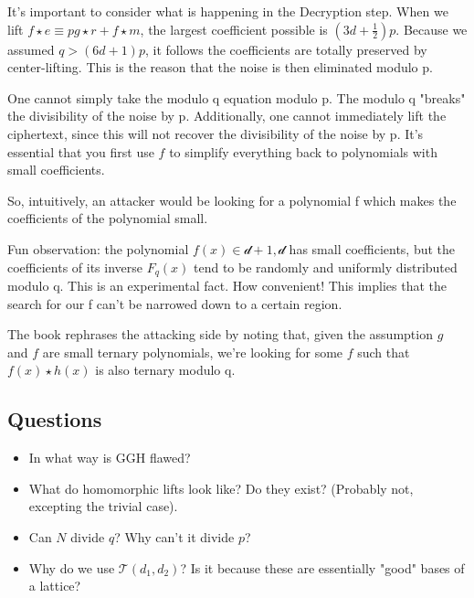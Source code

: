 \documentclass[10pt,a4paper]{article}
\theoremstyle{remark}
\begin{document}
It's important to consider what is happening in the Decryption step. When we lift $f\star e\equiv pg\star r + f\star m$, the largest coefficient possible is $\left(3d+\frac{1}{2}\right)p$. Because we assumed $q>(6d+1)p$, it follows the coefficients are totally preserved by center-lifting. This is the reason that the noise is then eliminated modulo p.

One cannot simply take the modulo q equation modulo p. The modulo q "breaks" the divisibility of the noise by p. Additionally, one cannot immediately lift the ciphertext, since this will not recover the divisibility of the noise by p. It's essential that you first use $f$ to simplify everything back to polynomials with small coefficients.

So, intuitively, an attacker would be looking for a polynomial f which makes the coefficients of the polynomial small.

Fun observation: the polynomial $f(x)\in\mathcal{d+1,d}$ has small coefficients, but the coefficients of its inverse $F_q(x)$ tend to be randomly and uniformly distributed modulo q. This is an experimental fact. How convenient! This implies that the search for our f can't be narrowed down to a certain region.

The book rephrases the attacking side by noting that, given the assumption $g$ and $f$ are small ternary polynomials, we're looking for some $f$ such that $f(x)\star h(x)$ is also ternary modulo q. 

\subsection{Questions}
\begin{itemize}
\item In what way is GGH flawed?
\item What do homomorphic lifts look like? Do they exist? (Probably not, excepting the trivial case).
\item Can $N$ divide $q$? Why can't it divide $p$?
\item Why do we use $\mathcal{T}(d_1,d_2)$? Is it because these are essentially "good" bases of a lattice? 
\end{itemize}
\end{document}

